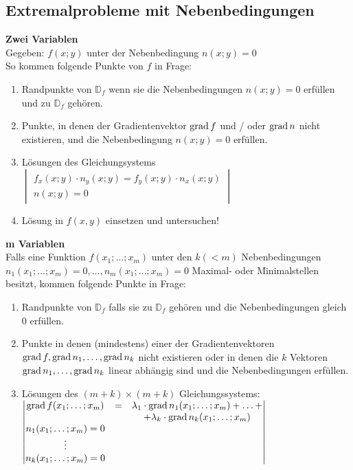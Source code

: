\subsection{Extremalprobleme mit Nebenbedingungen}
  \textbf{Zwei Variablen}\\
  Gegeben: $f(x;y)$ unter der Nebenbedingung $n(x;y) = 0$\\
  So kommen folgende Punkte von $f$ in Frage:
  \begin{enumerate}
    \item 
      Randpunkte von $\mathbb{D}_f$ wenn sie die Nebenbedingungen  $n(x;y) = 0$ erfüllen und zu $\mathbb{D}_f$ gehören.
    \item 
      Punkte, in denen der Gradientenvektor $\operatorname{grad} f $ und / oder $\operatorname{grad} n$ nicht existieren, und die Nebenbedingung
      $n(x;y) = 0$ erfüllen.
    \item 
      Lösungen des Gleichungsystems\\
      $ \begin{vmatrix}
        f_x(x;y) \cdot n_y(x;y) = f_y(x;y) \cdot n_x(x;y) \\
        n(x;y) = 0
     \end{vmatrix} $
   \item 
     Lösung in $f(x,y)$ einsetzen und untersuchen!
 \end{enumerate}
 
\newpage 
 
  
 \textbf{m Variablen}\\
 Falls eine Funktion $f(x_1;\ldots;x_m)$ unter den $k(<m)$ Nebenbedingungen $n_1(x_1;\ldots;x_m)=0, \ldots, n_m(x_1;\ldots;x_m)=0$
 Maximal- oder Minimalstellen besitzt, kommen folgende Punkte in Frage:\\
 \begin{enumerate}
   \item
     Randpunkte von $\mathbb{D}_f$ falls sie zu $\mathbb{D}_f$ gehören und die Nebenbedingungen gleich 0 erfüllen.
   \item
     Punkte in denen (mindestens) einer der Gradientenvektoren $\operatorname{grad} f, \operatorname{grad} n_1, \ldots, \operatorname{grad} n_k$ nicht existieren
     oder in denen die $k$ Vektoren $\operatorname{grad} n_1, \ldots, \operatorname{grad} n_k$ linear abhängig sind und die Nebenbedingungen erfüllen.
   \item
     Lösungen des $(m+k)\times(m+k)$ Gleichungssystems:\\
     $\begin{vmatrix}
       \operatorname{grad} f(x_1;\ldots;x_m) & = & \lambda_1 \cdot \operatorname{grad} n_1(x_1;\ldots;x_m)+ \ldots + \\
       & & +\lambda_k \cdot \operatorname{grad} n_k(x_1;\ldots;x_m) \\
       n_1(x_1;\ldots;x_m) = 0 \\
       \vdots \\
       n_k(x_1;\ldots;x_m) = 0
     \end{vmatrix}$
 \end{enumerate}
